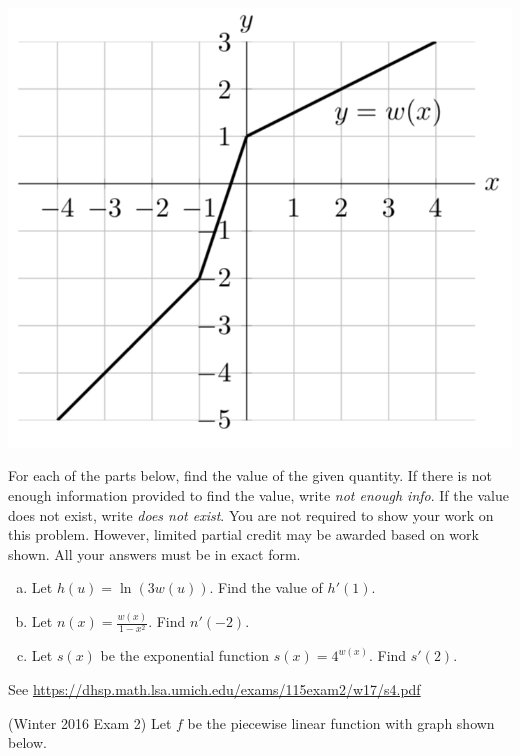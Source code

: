 \documentclass[11pt]{exam}
\begin{document}
\begin{questions}
\begin{center}
    \includegraphics[scale=0.6]{Figures/graphw.png}
  \end{center}
	For each of the parts below, find the value of the given quantity. If there is not enough information provided to find the value, write \emph{not enough info}. If the value does not exist, write \emph{does not exist}. You are not required to show your work on this problem. However, limited partial credit
may be awarded based on work shown. All your
answers must be in exact form.
	\begin{enumerate}[(a)]
		\item Let $h(u) = \ln(3w(u))$. Find the value of $h'(1)$.
		\item Let $n(x) = \frac{w(x)}{1-x^2}$. Find $n'(-2)$.
		\item Let $s(x)$ be the exponential function $s(x) = 4^{w(x)}$. Find $s'(2)$.
	\end{enumerate}
        \begin{solution}
          See \href{https://dhsp.math.lsa.umich.edu/exams/115exam2/w17/s4.pdf}{https://dhsp.math.lsa.umich.edu/exams/115exam2/w17/s4.pdf}
        \end{solution}
\question (Winter 2016 Exam 2) Let $f$ be the piecewise linear function with graph shown below.


\end{questions}
\end{document}

